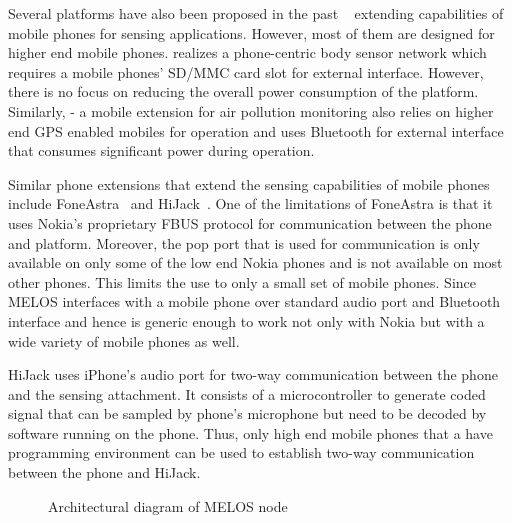 \documentclass[10pt]{sigplan-proc-varsize}
\newcommand{\redcolor}[1]{\textcolor{red}{#1}}
\newcommand{\melos}{MELOS }
\begin{document}
Several platforms have also been proposed in the past ~\cite{psi,nsmarts,smartconnect,foneastra,hijack} extending capabilities of mobile phones for sensing applications. However, most of them are designed for higher end mobile phones. \cite{psi} realizes a phone-centric body sensor network which requires a mobile phones'  SD/MMC card slot for external interface. However, there is no focus on reducing the overall power consumption of the platform. Similarly, \cite{nsmarts} - a mobile extension for air pollution monitoring also relies on higher end GPS enabled mobiles for operation and uses Bluetooth for external interface that consumes significant power during operation. 

Similar phone extensions that extend the sensing capabilities of mobile phones include FoneAstra~\cite{foneastra} and HiJack~\cite{hijack}. One of the limitations of FoneAstra is that it uses Nokia's proprietary FBUS protocol for communication between the phone and platform. Moreover, the pop port that is used for communication is only available on only some of the low end Nokia phones and is not available on most other phones. This limits the use to only a small set of mobile phones. Since \melos interfaces with a mobile phone over standard audio port and Bluetooth interface and hence is generic enough to work not only with Nokia but with a wide variety of mobile phones as well. 

HiJack uses iPhone's audio port for two-way communication between the phone and the sensing attachment. It consists of a microcontroller to generate coded signal that can be sampled by phone's microphone but need to be decoded by software running on the phone. Thus, only high end mobile phones that a have programming environment can be used to establish two-way communication between the phone and HiJack.

\begin{figure}
\centering
{}
\caption{Architectural diagram of \melos node}
\label{fig:blockdiagram}
\end{figure}

\end{document}
